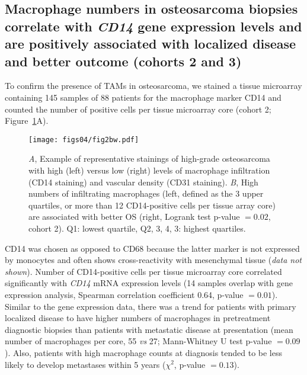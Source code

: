 \subsection{Macrophage numbers in osteosarcoma biopsies
correlate with {\it CD14} gene expression levels and are
positively associated with localized disease and better
outcome (cohorts 2 and 3)}
To confirm the presence of TAMs in osteosarcoma, we
stained a tissue microarray containing 145 samples of 88
patients for the macrophage marker CD14 and counted the
number of positive cells per tissue microarray core (cohort
2; Figure~\ref{fig4.2}A).
%
%
\begin{figure}[htbp]
	\centering
	\texttt{[image: figs04/fig2bw.pdf]}	%
	\caption{{\it A}, Example of representative stainings of high\hyp{}grade osteosarcoma with high (left) versus low (right) levels of macrophage infiltration (CD14 staining) and vascular density (CD31 staining). {\it B}, High numbers of infiltrating macrophages (left, defined as the 3 upper quartiles, or more than 12 CD14\hyp{}positive cells per tissue array core) are associated with better OS (right, Logrank test p-value $=0.02$, cohort 2). Q1: lowest quartile, Q2, 3, 4, 3: highest quartiles.}
	\label{fig4.2}
\end{figure}
%
CD14 was chosen as opposed to CD68 because
the latter marker is not expressed by monocytes and often
shows cross\hyp{}reactivity with mesenchymal tissue ({\it data not
shown}). Number of CD14\hyp{}positive cells per tissue microarray
core correlated significantly with {\it CD14} mRNA expression
levels (14 samples overlap with gene expression
analysis, Spearman correlation coefficient 0.64, p-value $=0.01$). Similar to the gene expression data, there was a
trend for patients with primary localized disease to have
higher numbers of macrophages in pretreatment diagnostic
biopsies than patients with metastatic disease at presentation
(mean number of macrophages per core, 55 {\it vs} 27;
Mann\hyp{}Whitney U test p-value $=0.09$). Also, patients with
high macrophage counts at diagnosis tended to be less
likely to develop metastases within 5 years ($\chi^2$, p-value $=0.13$).

